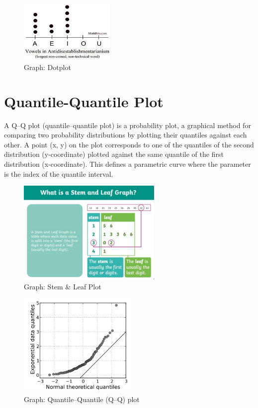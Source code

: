 \begin{figure}
    \centering
    \includegraphics[height=3cm]{Pictures/data/data_dotplot.jpg}
    \caption{Graph: Dotplot}
\end{figure}

\section{Quantile-Quantile Plot \cite{wiki-q-q-plot}}\label{Quantile-Quantile Plot}
A Q–Q plot (quantile–quantile plot) is a probability plot, a graphical method for comparing two probability distributions by plotting their quantiles against each other. A point (x, y) on the plot corresponds to one of the quantiles of the second distribution (y-coordinate) plotted against the same quantile of the first distribution (x-coordinate). This defines a parametric curve where the parameter is the index of the quantile interval.

\begin{table}[H]
    \begin{minipage}{0.45\textwidth}
        \begin{figure}[H]
            \includegraphics[height=5cm]{Pictures/data/data_stem-and-leaf-plot.jpg}
            \caption{Graph: Stem \& Leaf Plot}
        \end{figure}
    \end{minipage}
    \hfill
    \begin{minipage}{0.45\textwidth}
        \begin{figure}[H]
            \includegraphics[height=5cm]{Pictures/data/data_q_q_plot.png}
            \caption{Graph: Quantile–Quantile (Q–Q) plot}
        \end{figure}
    \end{minipage}
\end{table}


